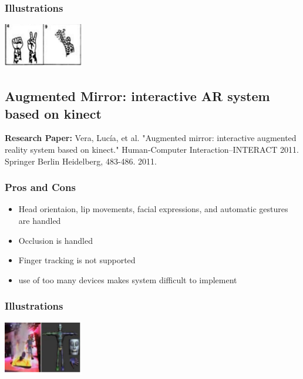 \documentclass[a4paper,10pt]{report}
\begin{document}
\subsubsection{Illustrations}\newline\newline
\includegraphics{./tech5.png}
\newline\newline


\subsection{Augmented Mirror: interactive AR system based on kinect}
\textbf{Research Paper:} Vera, Lucía, et al. "Augmented mirror: interactive augmented reality system based on kinect." Human-Computer Interaction–INTERACT 2011. Springer Berlin Heidelberg, 483-486. 2011.
\subsubsection{Pros and Cons}
\begin{itemize}
 \item Head orientaion, lip movements, facial expressions, and automatic gestures are handled
 \item Occlusion is handled
 \item Finger tracking is not supported
 \item use of too many devices makes system difficult to implement
\end{itemize}
\subsubsection{Illustrations}\newline\newline
\includegraphics{./tech6.png}
\newline\newline
\end{document}
